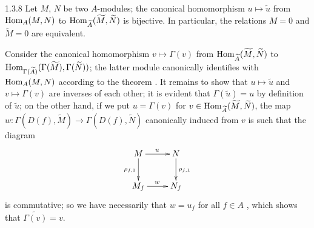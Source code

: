 \begin{envs}[Corollary]{1.3.8}
\label{cor-1.1.3.8}
Let $M$, $N$ be two $A$-modules; the canonical homomorphism $u\mapsto\widetilde{u}$ from
${\mathop{\mathrm{Hom}}\nolimits}_A(M,N)$ to ${\mathop{\mathrm{Hom}}\nolimits}_{\widetilde{A}}(\widetilde{M},\widetilde{N})$ is bijective. In
particular, the relations $M=0$ and $\widetilde{M}=0$ are equivalent.
\end{envs}

Consider the canonical homomorphism $v\mapsto\Gamma(v)$ from
${\mathop{\mathrm{Hom}}\nolimits}_{\widetilde{A}}(\widetilde{M},\widetilde{N})$ to
${\mathop{\mathrm{Hom}}\nolimits}_{\Gamma(\widetilde{A})}(\Gamma(\widetilde{M}),\Gamma(\widetilde{N}))$; the latter
module canonically identifies with ${\mathop{\mathrm{Hom}}\nolimits}_A(M,N)$ according to the theorem .
It remains to show that $u\mapsto\widetilde{u}$ and $v\mapsto\Gamma(v)$ are inverses of each
other; it is evident that $\Gamma(\widetilde{u})=u$ by definition of $\widetilde{u}$; on the
other hand, if we put $u=\Gamma(v)$ for
$v\in{\mathop{\mathrm{Hom}}\nolimits}_{\widetilde{A}}(\widetilde{M},\widetilde{N})$, the map
$w:\Gamma(D(f),\widetilde{M})\to\Gamma(D(f),\widetilde{N})$ canonically induced from $v$
is such that the diagram
\[
  \xymatrix{
    M\ar[r]^u\ar[d]_{\rho_{f,1}} & N\ar[d]^{\rho_{f,1}}\\
    M_f\ar[r]^w & N_f
  }
\]
is commutative; so we have necessarily that $w=u_f$ for all $f\in A$ , which
shows that $\widetilde{\Gamma(v)}=v$.

